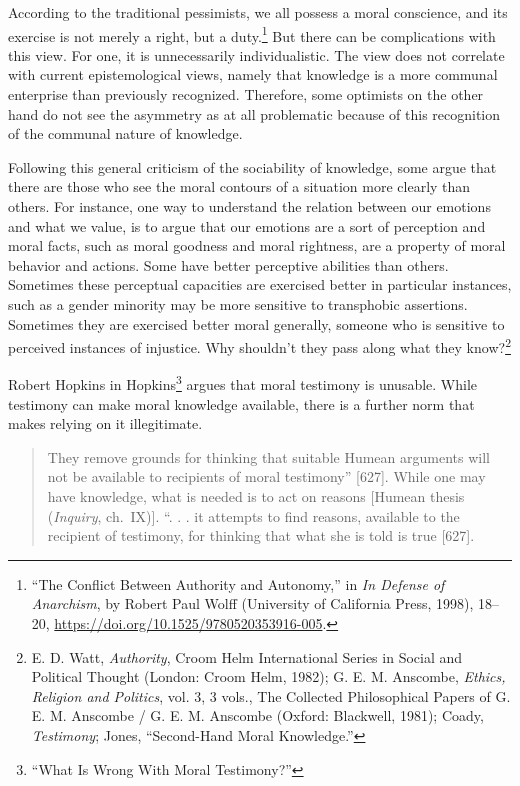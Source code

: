\documentclass[phdthesis,12pt,final]{wuthesis}
\theoremstyle{definition}
\theoremstyle{definition}
\theoremstyle{definition}
\theoremstyle{definition}
\theoremstyle{remark}
\begin{document}
According to the traditional pessimists, we all possess a moral conscience, and its exercise is not merely a right, but a duty.\footnote{{``The {Conflict Between Authority} and {Autonomy},''} in \emph{In {Defense} of {Anarchism}}, by Robert Paul Wolff (University of California Press, 1998), 18--20, \url{https://doi.org/10.1525/9780520353916-005}.} But there can be complications with this view. For one, it is unnecessarily individualistic. The view does not correlate with current epistemological views, namely that knowledge is a more communal enterprise than previously recognized. Therefore, some optimists on the other hand do not see the asymmetry as at all problematic because of this recognition of the communal nature of knowledge.

Following this general criticism of the sociability of knowledge, some argue that there are those who see the moral contours of a situation more clearly than others. For instance, one way to understand the relation between our emotions and what we value, is to argue that our emotions are a sort of perception and moral facts, such as moral goodness and moral rightness, are a property of moral behavior and actions. Some have better perceptive abilities than others. Sometimes these perceptual capacities are exercised better in particular instances, such as a gender minority may be more sensitive to transphobic assertions. Sometimes they are exercised better moral generally, someone who is sensitive to perceived instances of injustice. Why shouldn't they pass along what they know?\footnote{E. D. Watt, \emph{Authority}, Croom {Helm} International Series in Social and Political Thought (London: Croom Helm, 1982); G. E. M. Anscombe, \emph{Ethics, Religion and Politics}, vol. 3, 3 vols., The Collected Philosophical Papers of {G}. {E}. {M}. {Anscombe} / {G}. {E}. {M}. {Anscombe} (Oxford: Blackwell, 1981); Coady, \emph{Testimony}; Jones, {``Second-{Hand Moral Knowledge}.''}}

Robert Hopkins in Hopkins\footnote{{``What {Is Wrong With Moral Testimony}?''}} argues that moral testimony is unusable. While testimony can make moral knowledge available, there is a further norm that makes relying on it illegitimate.

\begin{quote}
They remove grounds for thinking that suitable Humean arguments will not be available to recipients of moral testimony'' {[}627{]}. While one may have knowledge, what is needed is to act on reasons {[}Humean thesis (\emph{Inquiry}, ch.~IX){]}. ``. . . it attempts to find reasons, available to the recipient of testimony, for thinking that what she is told is true {[}627{]}.
\end{quote}
\end{document}
